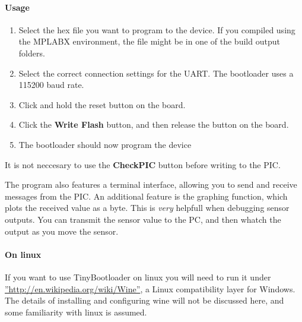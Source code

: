\documentclass{article}
\begin{document}
\paragraph{Usage}
\begin{enumerate}
\item Select the hex file you want to program to the device. If you compiled using the MPLABX environment, the file might be in one of the build output folders.
\item Select the correct connection settings for the UART. The bootloader uses a 115200 baud rate.
\item Click and hold the reset button on the board. 
\item Click the \textbf{Write Flash} button, and then release the button on the board.
\item The bootloader should now program the device
\end{enumerate}
It is not neccesary to use the \textbf{CheckPIC} button before writing to the PIC.

The program also features a terminal interface, allowing you to send and receive messages from the PIC. An additional feature is the graphing function, which plots the received value as a byte. This is \textit{very} helpfull when debugging sensor outputs. You can transmit the sensor value to the PC, and then whatch the output as you move the sensor. 
\paragraph{On linux}
If you want to use TinyBootloader on linux you will need to run it under \hyperref[Wine]{''http://en.wikipedia.org/wiki/Wine''}, a Linux compatibility layer for Windows. The details of installing and configuring wine will not be discussed here, and some familiarity with linux is assumed.
\end{document}
